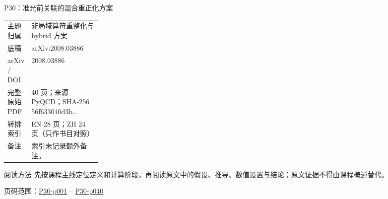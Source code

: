 \documentclass[aspectratio=169,10pt]{ctexbeamer}
\begin{document}
\begin{frame}[t]{P30：准光前关联的混合重正化方案}
\small\begin{tabularx}{\linewidth}{p{0.22\linewidth}Y}
\toprule 主题归属 & 非局域算符重整化与 hybrid 方案\\
底稿 & arXiv:2008.03886\\
arXiv / DOI & 2008.03886\\
完整原始 PDF & 40 页；来源 PyQCD；SHA-256 56f633040d3b\ldots\\
转排索引 & EN 28 页；ZH 24 页（只作书目对照）\\
备注 & 索引未记录额外备注。\\
\bottomrule\end{tabularx}\vspace{0.25cm}
\begin{block}{阅读方法}
先按课程主线定位定义和计算阶段，再阅读原文中的假设、推导、数值设置与结论；原文证据不得由课程概述替代。
\end{block}
\vfill 页码范围：\hyperlink{P30-p001}{P30-p001} -- \hyperlink{P30-p040}{P30-p040}
\end{frame}
\end{document}
